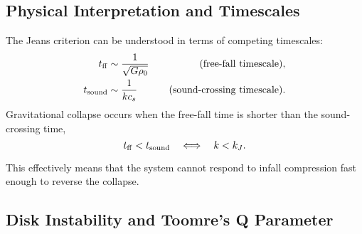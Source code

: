 \subsection*{Physical Interpretation and Timescales}

The Jeans criterion can be understood in terms of competing timescales:
\begin{align}
t_{\rm ff} &\sim \frac{1}{\sqrt{G\rho_0}} 
\quad &\text{(free-fall timescale)},\\
t_{\rm sound} &\sim \frac{1}{k c_s}
\quad &\text{(sound-crossing timescale)}.
\end{align}
Gravitational collapse occurs when the free-fall time is shorter than the sound-crossing time,
\begin{equation}
t_{\rm ff} < t_{\rm sound}
\quad \Longleftrightarrow \quad
k < k_J.
\end{equation}

This effectively means that the system cannot respond to infall compression fast enough to reverse the collapse.

\subsection{Disk Instability and Toomre's Q Parameter}

